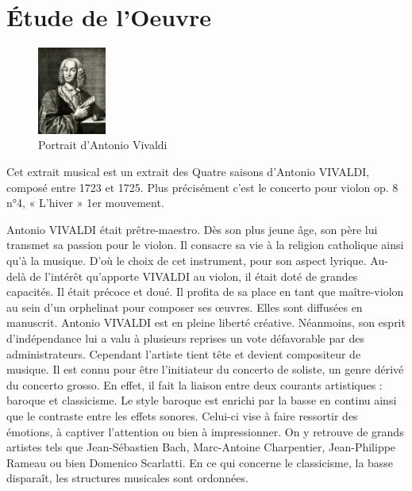 \documentclass[12pt]{article}
\begin{document}




\section{Étude de l'Oeuvre}

\begin{figure}
    \centering
    \includegraphics[width=0.2\textwidth]{./images/portrait_vivaldi.jpg}
    \caption*{Portrait d'Antonio Vivaldi}
\end{figure}

Cet extrait musical est un extrait des Quatre saisons d’Antonio VIVALDI, composé entre 1723 et 1725. 
Plus précisément c’est le concerto pour violon op. 8 n°4, « L’hiver » 1er mouvement. 

Antonio VIVALDI était prêtre-maestro. Dès son plus jeune âge, son père lui transmet sa passion pour le violon. 
Il consacre sa vie à la religion catholique ainsi qu’à la musique. D’où le choix de cet instrument, 
pour son aspect lyrique. Au-delà de l'intérêt qu'apporte VIVALDI au violon, il était doté de grandes capacités. 
Il était précoce et doué. Il profita de sa place en tant que maître-violon au sein d’un orphelinat pour composer ses œuvres.
Elles sont diffusées en manuscrit. Antonio VIVALDI est en pleine liberté créative. 
Néanmoins, son esprit d’indépendance lui a valu à plusieurs reprises un vote défavorable par des administrateurs. 
Cependant l’artiste tient tête et devient compositeur de musique. Il est connu pour être l’initiateur du concerto de soliste, 
un genre dérivé du concerto grosso. En effet, il fait la liaison entre deux courants artistiques : baroque et classicisme. 
Le style baroque est enrichi par la basse en continu ainsi que le contraste entre les effets sonores. 
Celui-ci vise à faire ressortir des émotions, à captiver l’attention ou bien à impressionner. 
On y retrouve de grands artistes tels que Jean-Sébastien Bach, Marc-Antoine Charpentier, Jean-Philippe Rameau ou 
bien Domenico Scarlatti. En ce qui concerne le classicisme, la basse disparaît, les structures musicales sont ordonnées. 
\end{document}
